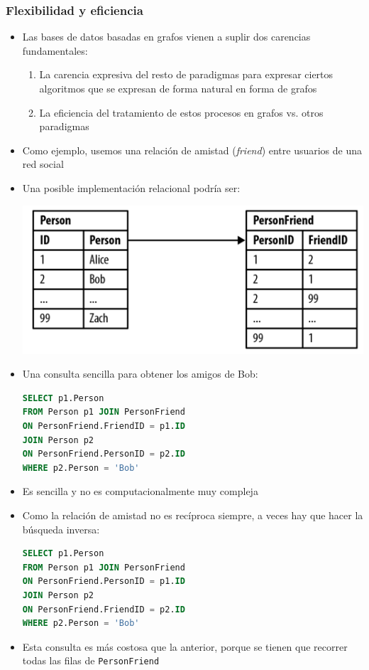 \documentclass[14pt]{beamer}
\begin{document}
\begin{frame}
  \frametitle{Flexibilidad y eficiencia}
\begin{itemize}
\item Las bases de datos basadas en grafos vienen a suplir dos carencias
  fundamentales:
  \begin{enumerate}
  \item La carencia expresiva del resto de paradigmas para expresar ciertos
    algoritmos que se expresan de forma natural en forma de grafos
  \item La eficiencia del tratamiento de estos procesos en grafos vs. otros
    paradigmas
  \end{enumerate}
\item Como ejemplo, usemos una relación de amistad ({\em friend\/}) entre
  usuarios de una red social
\framebreak
\item Una posible implementación relacional podría ser:
  \begin{center}
    \includegraphics[width=.7\textwidth]{img/friends_table}
  \end{center}
\framebreak
\item Una consulta sencilla para obtener los amigos de Bob:
\begin{lstlisting}[language=SQL]
SELECT p1.Person
FROM Person p1 JOIN PersonFriend
ON PersonFriend.FriendID = p1.ID
JOIN Person p2
ON PersonFriend.PersonID = p2.ID
WHERE p2.Person = 'Bob'
\end{lstlisting}
\item Es sencilla y no es computacionalmente muy compleja
\item Como la relación de amistad no es recíproca siempre, a veces hay que
  hacer la búsqueda inversa:
\begin{lstlisting}[language=SQL]
SELECT p1.Person
FROM Person p1 JOIN PersonFriend
ON PersonFriend.PersonID = p1.ID
JOIN Person p2
ON PersonFriend.FriendID = p2.ID
WHERE p2.Person = 'Bob'
\end{lstlisting}
\item Esta consulta es más costosa que la anterior, porque se tienen que
  recorrer todas las filas de {\tt PersonFriend}


\end{itemize}
\end{frame}
\end{document}
